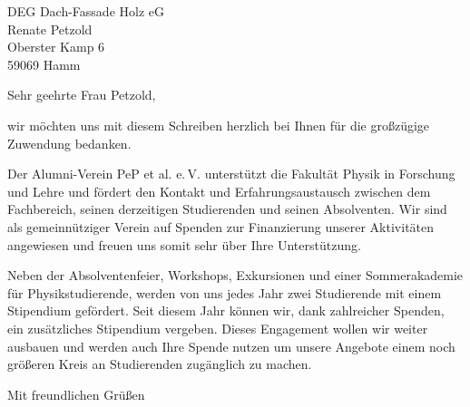 \documentclass[
  pepbrief,
  fontsize=12pt,
  paper=a4,
  DIV=14,
  parskip=half,
  backaddress=false,
]{scrlttr2}
\author{Sascha Dungs}
\begin{document}
\begin{letter}{%
  DEG Dach-Fassade Holz eG\\
  Renate Petzold\\
  Oberster Kamp 6\\
  59069 Hamm%
}
\opening{Sehr geehrte Frau Petzold,}
wir möchten uns mit diesem Schreiben herzlich bei Ihnen für die großzügige Zuwendung bedanken. 

Der Alumni-Verein PeP et al. e.\,V. unterstützt die Fakultät Physik in Forschung und Lehre und fördert den Kontakt und Erfahrungsaustausch zwischen dem Fachbereich,
seinen derzeitigen Studierenden und seinen Absolventen.
Wir sind als gemeinnütziger Verein auf Spenden zur Finanzierung unserer Aktivitäten angewiesen und freuen uns somit sehr über Ihre Unterstützung. 

Neben der Absolventenfeier, Workshops, Exkursionen und einer Sommerakademie für Physikstudierende, werden von uns jedes Jahr zwei Studierende mit einem Stipendium gefördert.
Seit diesem Jahr können wir, dank zahlreicher Spenden, ein zusätzliches Stipendium vergeben.
Dieses Engagement wollen wir weiter ausbauen und werden auch Ihre Spende nutzen um unsere Angebote einem noch größeren Kreis an Studierenden zugänglich zu machen.

\closing{Mit freundlichen Grüßen}

\end{letter}
\end{document}
